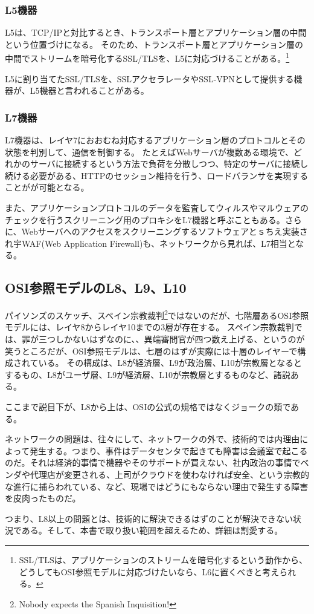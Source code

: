 \subsubsection{L5機器}

L5は、TCP/IPと対比するとき、トランスポート層とアプリケーション層の中間という位置づけになる。
そのため、トランスポート層とアプリケーション層の中間でストリームを暗号化するSSL/TLSを、L5に対応づけることがある。\footnote{SSL/TLSは、アプリケーションのストリームを暗号化するという動作から、どうしてもOSI参照モデルに対応づけたいなら、L6に置くべきと考えられる。}

L5に割り当てたSSL/TLSを、SSLアクセラレータやSSL-VPNとして提供する機器が、L5機器と言われることがある。

\subsubsection{L7機器}

L7機器は、レイヤ7におおむね対応するアプリケーション層のプロトコルとその状態を判別して、通信を制御する。
たとえばWebサーバが複数ある環境で、どれかのサーバに接続するという方法で負荷を分散しつつ、特定のサーバに接続し続ける必要がある、HTTPのセッション維持を行う、ロードバランサを実現することがが可能となる。

また、アプリケーションプロトコルのデータを監査してウィルスやマルウェアのチェックを行うスクリーニング用のプロキシをL7機器と呼ぶこともある。さらに、Webサーバへのアクセスをスクリーニングするソフトウェアとｓちえ実装され宇WAF(Web Application Firewall)も、ネットワークから見れば、L7相当となる。

\subsection{OSI参照モデルのL8、L9、L10}

パイソンズのスケッチ、スペイン宗教裁判\footnote{Nobody expects the Spanish Inquisition!}ではないのだが、七階層あるOSI参照モデルには、レイヤ8からレイヤ10までの3層が存在する。
スペイン宗教裁判では、罪が三つしかないはずなのに、、異端審問官が四つ数え上げる、というのが笑うところだが、OSI参照モデルは、七層のはずが実際には十層のレイヤーで構成されている。
その構成は、L8が経済層、L9が政治層、L10が宗教層となるとするもの、L8がユーザ層、L9が経済層、L10が宗教層とするものなど、諸説ある。

ここまで説目下が、L8から上は、OSIの公式の規格ではなくジョークの類である。

ネットワークの問題は、往々にして、ネットワークの外で、技術的では内理由によって発生する。つまり、事件はデータセンタで起きても障害は会議室で起こるのだ。それは経済的事情で機器やそのサポートが買えない、社内政治の事情でベンダや代理店が変更される、上司がクラウドを使わなければ安全、という宗教的な進行に捕らわれている、など、現場ではどうにもならない理由で発生する障害を皮肉ったものだ。

つまり、L8以上の問題とは、技術的に解決できるはずのことが解決できない状況である。そして、本書で取り扱い範囲を超えるため、詳細は割愛する。

